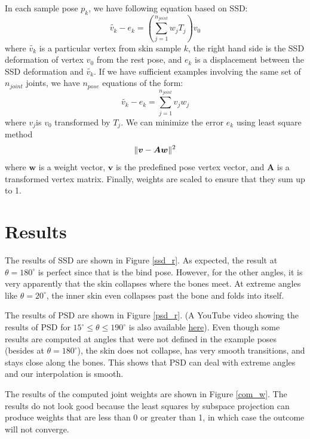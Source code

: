 \documentclass[11pt,twocolumn,letterpaper]{article}
\begin{document}
In each sample pose $p_k$, we have following equation based on SSD:
\begin{equation}
	\tilde{v_k}-e_k=(\sum_{j=1}^{n_{joint}}w_jT_j)v_0
\end{equation}
where $\tilde{v_k}$ is a particular vertex from skin sample $k$, the right hand side is the SSD deformation of vertex $v_0$ from the rest pose, and $e_k$ is a displacement between the SSD deformation and $\tilde{v_k}$.
If we have sufficient examples involving the same set of $n_{joint}$ joints, we have $n_{pose}$ equations of the form:
\begin{equation}
	\tilde{v_k}-e_k=\sum_{j=1}^{n_{joint}}v_jw_j
\end{equation}
where $v_j$is $v_0$ transformed by $T_j$. We can minimize the error $e_k$ using least square method
\begin{equation}
	\Arrowvert\boldsymbol{v}-\boldsymbol{Aw}\Arrowvert^2
\end{equation}
where $\boldsymbol{w}$ is a weight vector, $\boldsymbol{v}$ is the predefined pose vertex vector, and $\boldsymbol{A}$ is a transformed vertex matrix. Finally, weights are scaled to ensure that they sum up to 1.

\section{Results}

The results of SSD are shown in Figure \ref{ssd_r}. As expected, the result at $\theta = 180^{\circ}$ is perfect since that is the bind pose. However, for the other angles, it is very apparently that the skin collapses where the bones meet. At extreme angles like $\theta = 20^{\circ}$, the inner skin even collapses past the bone and folds into itself.

The results of PSD are shown in Figure \ref{psd_r}. (A YouTube video showing the results of PSD for $15^{\circ} \leq \theta \leq 190^{\circ}$ is also available \href{https://youtu.be/v3lwH1p3HBU}{here}). Even though some results are computed at angles that were not defined in the example poses (besides at $\theta = 180^{\circ}$), the skin does not collapse, has very smooth transitions, and stays close along the bones. This shows that PSD can deal with extreme angles and our interpolation is smooth.

The results of the computed joint weights are shown in Figure \ref{com_w}. The results do not look good because the least squares by subspace projection can produce weights that are less than 0 or greater than 1, in which case the outcome will not converge.
\end{document}
